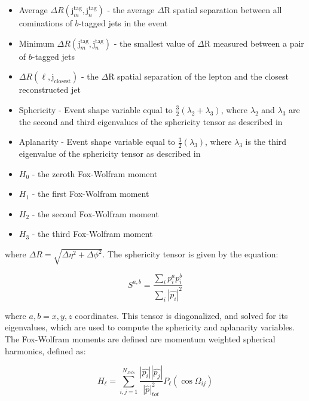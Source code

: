 \begin{itemize}
  \item Average $\Delta
    R(\text{j}_m^{\text{tag}},\text{j}_n^{\text{tag}})$  - the average
    $\Delta$R spatial separation between all cominations of $b$-tagged
    jets in the event
  \item Minimum $\Delta
    R(\text{j}_m^{\text{tag}},\text{j}_n^{\text{tag}})$ - the smallest
    value of $\Delta$R measured between a pair of $b$-tagged jets
  \item $\Delta R(\ell,\text{j}_{\text{closest}})$ - the $\Delta$R
    spatial separation of the lepton and the closest reconstructed jet
  \item Sphericity - Event shape variable equal to $\frac{3}{2}
    (\lambda_{2} + \lambda_{3})$, where $\lambda_{2}$ and
    $\lambda_{3}$ are the second and third eigenvalues of the
    sphericity tensor as described in\cite{sphericity} 
  \item Aplanarity - Event shape variable equal to
    \(\frac{3}{2}(\lambda_{3})\), where \(\lambda_{3}\) is the third
    eigenvalue of the sphericity tensor as described in 
  \item $H_0$ - the zeroth Fox-Wolfram moment ~\cite{FoxWolfram}
  \item $H_1$ - the first Fox-Wolfram moment 
  \item $H_2$ - the second Fox-Wolfram moment
  \item $H_3$ - the third Fox-Wolfram moment
\end{itemize}

\noindent where $\Delta R = \sqrt{\Delta\eta^{2} + \Delta\phi^{2}}$.
The sphericity tensor is given by the equation:

\begin{equation}\label{eq:sphericity_tensor}
S^{a,b} = \frac{ \sum_{i}p_{i}^{a}p_{i}^{b} }{ \sum_{i} |\hat{p_{i}}|^{2} }
\end{equation}

\noindent where $a,b = x,y,z$ coordinates.  This tensor is
diagonalized, and solved for its eigenvalues, which are used to
compute the sphericity and aplanarity variables.  The Fox-Wolfram
moments are defined are momentum weighted spherical harmonics, defined
as: 

\begin{equation}\label{eq:fox_wolfram}
H_{\ell} = \sum_{i,j=1}^{N_{Jets}} \frac{ |\hat{p_{i}}||\hat{p_{j}}|
}{ |\hat{p}|_{tot}^{2} } P_{\ell}(\cos{\Omega_{ij}})
\end{equation}

